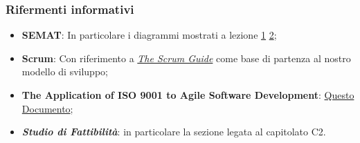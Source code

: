 \subsubsection{Rifermenti informativi}
\begin{itemize}
  \item \textbf{SEMAT}: In particolare i diagrammi mostrati a lezione
  \href{https://www.math.unipd.it/~tullio/IS-1/2013/Materiale/SEMAT_Cards_A7.pdf}{1}
  \href{https://www.math.unipd.it/~tullio/IS-1/2013/Materiale/SEMAT_Cards_A8.pdf}{2};
  \item \textbf{Scrum}: Con riferimento a \href{https://www.scrumguides.org/docs/scrumguide/v2017/2017-Scrum-Guide-US.pdf}{\textit{The Scrum Guide}}
  come base di partenza al nostro modello di sviluppo;
  \item \textbf{The Application of ISO 9001 to Agile Software Development}: \href{https://www.researchgate.net/profile/Tor_Stalhane/publication/221219267_The_Application_of_ISO_9001_to_Agile_Software_Development/links/00b49536d4f058a949000000/The-Application-of-ISO-9001-to-Agile-Software-Development.pdf?origin=publication_detail&page=2}{Questo Documento};
  \item \textbf{\textit{Studio di Fattibilità\docs}}: in particolare la sezione legata al capitolato C2.

\end{itemize}
